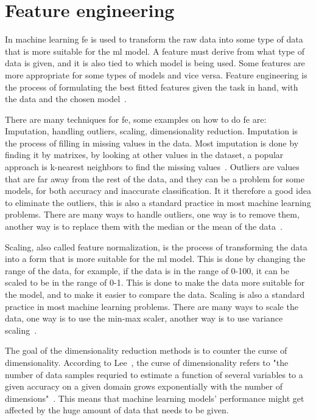 \section{Feature engineering}\label{sec:feature-engineering}
In machine learning \gls{fe} is used to transform the raw data into some type of data that is more suitable for the \gls{ml} model. A feature must derive from what type of data is given, and it is also tied to which model is being used. Some features are more appropriate for some types of models and vice versa. Feature engineering is the process of formulating the best fitted features given the task in hand, with the data and the chosen model~\cite{Feature-engineering-zheng}.

There are many techniques for \gls{fe}, some examples on how to do \gls{fe} are: Imputation, handling outliers, scaling, dimensionality reduction. Imputation is the process of filling in missing values in the data. Most imputation is done by finding it by matrixes, by looking at other values in the dataset, a popular approach is k-nearest neighbors to find the missing values~\cite{imputation-for-tables-Biessmann}. Outliers are values that are far away from the rest of the data, and they can be a problem for some models, for both accuracy and inaccurate classification. It it therefore a good idea to eliminate the outliers, this is also a standard practice in most machine learning problems. There are many ways to handle outliers, one way is to remove them, another way is to replace them with the median or the mean of the data~\cite{outlier-perez}. 

Scaling, also called feature normalization, is the process of transforming the data into a form that is more suitable for the \gls{ml} model. This is done by changing the range of the data, for example, if the data is in the range of 0-100, it can be scaled to be in the range of 0-1. This is done to make the data more suitable for the model, and to make it easier to compare the data. Scaling is also a standard practice in most machine learning problems. There are many ways to scale the data, one way is to use the min-max scaler, another way is to use variance scaling~\cite{Feature-engineering-zheng}.

The goal of the dimensionality reduction methods is to counter the curse of dimensionality. 
According to Lee~\cite{nonlinear-dim-red-chapter-one}, the curse of dimensionality refers to "the number of data samples requried to estimate a function of several variables to a given accuracy on a given domain grows exponentially with the number of dimensions"~\cite{nonlinear-dim-red-chapter-one}. This means that machine learning models' performance might get affected by the huge amount of data that needs to be given.

